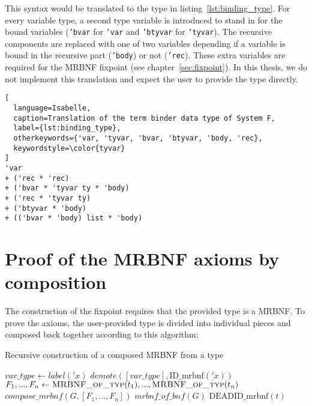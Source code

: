 This syntax would be translated to the type in listing~\ref{lst:binding_type}. For every variable type, a second type variable is introduced to stand in for the bound variables (\texttt{\textcolor{tyvar}{'bvar}} for \texttt{\textcolor{tyvar}{'var}} and \texttt{\textcolor{tyvar}{'btyvar}} for \texttt{\textcolor{tyvar}{'tyvar}}). The recursive components are replaced with one of two variables depending if a variable is bound in the recursive part (\texttt{\textcolor{tyvar}{'body}}) or not (\texttt{\textcolor{tyvar}{'rec}}). These extra variables are required for the \ac{MRBNF} fixpoint (see chapter~\ref{sec:fixpoint}). In this thesis, we do not implement this translation and expect the user to provide the type directly.

\begin{lstlisting}[
  language=Isabelle,
  caption=Translation of the term binder data type of System F,
  label={lst:binding_type},
  otherkeywords={'var, 'tyvar, 'bvar, 'btyvar, 'body, 'rec},
  keywordstyle=\color{tyvar}
]
'var
+ ('rec * 'rec)
+ ('bvar * 'tyvar ty * 'body)
+ ('rec * 'tyvar ty)
+ ('btyvar * 'body)
+ (('bvar * 'body) list * 'body)
\end{lstlisting}

\section{Proof of the \ac{MRBNF} axioms by composition}

The construction of the fixpoint requires that the provided type is a \ac{MRBNF}. To prove the axioms, the user-provided type is divided into individual pieces and composed back together according to this algorithm:

\begin{algorithm}
\caption{Recursive construction of a composed \ac{MRBNF} from a type}\label{alg:mrbnf_of_typ}
\begin{algorithmic}[1]
    \State $\textit{var\_type}\gets label('x)$ \Comment{\textcolor{darkgreen}{is $'x$ Live, Free, Bound or Dead?}}
    \State \Return $\textit{demote}([\textit{var\_type}], \text{ID\_mrbnf}('x))$
    \State $F_1,...,F_n\gets \Call{MRBNF\_of\_typ}{t_1},...,\Call{MRBNF\_of\_typ}{t_n}$
    \State \Return $\textit{compose\_mrbnf}(G, [F_1,...,F_n])$
    \State $\textit{mrbnf\_of\_bnf}(G)$ \Comment{\textcolor{darkgreen}{Convert G to a MRBNF and register it for future use}}
    \State \Return {}
  \Else
    \State \Return $\text{DEADID\_mrbnf}(t)$ \Comment{\textcolor{red}{TODO: ask Dmitriy what is really going on here}}
  \EndIf
\EndFunction
\end{algorithmic}
\end{algorithm}

